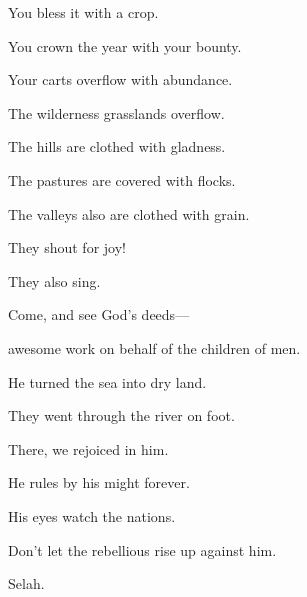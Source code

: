 {\par }{\QB You bless it with a crop.
\par }{\Q {}You crown the year with your bounty.
\par }{\QB Your carts overflow with abundance.
\par }{\Q {}The wilderness grasslands overflow.
\par }{\QB The hills are clothed with gladness.
\par }{\Q {}The pastures are covered with flocks.
\par }{\QB The valleys also are clothed with grain.
\par }{\Q They shout for joy!
\par }{\QB They also sing.

\par }
{\Q {}Come, and see God’s deeds—
\par }{\QB awesome work on behalf of the children of men.
\par }{\Q {}He turned the sea into dry land.
\par }{\QB They went through the river on foot.
\par }{\QB There, we rejoiced in him.
\par }{\Q {}He rules by his might forever.
\par }{\QB His eyes watch the nations.
\par }{\QB Don’t let the rebellious rise up against him.
\par }{\QS Selah.\par }
